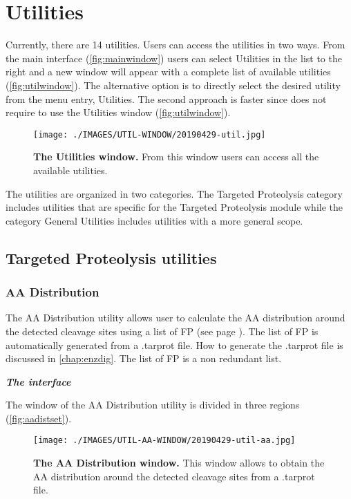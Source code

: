 \chapter{Utilities}
\label{chap:util}

Currently, there are \num{14} utilities. Users can access the utilities in two ways. From the main interface (\autoref{fig:mainwindow}) users can select Utilities in the list to the right and a new window will appear with a complete list of available utilities (\autoref{fig:utilwindow}). The alternative option is to directly select the desired utility from the menu entry, Utilities. The second approach is faster since does not require to use the Utilities window (\autoref{fig:utilwindow}).

\begin{figure}[h]
	\centering
	\texttt{[image: ./IMAGES/UTIL-WINDOW/20190429-util.jpg]}	    
	\caption[The Utilities window]{\textbf{The Utilities window.} From this window users can access all the available utilities.} 
	\label{fig:utilwindow}
	\vspace{-5pt} 	
\end{figure} 

The utilities are organized in two categories. The Targeted Proteolysis category includes utilities that are specific for the Targeted Proteolysis module while the category General Utilities includes utilities with a more general scope.

\section{Targeted Proteolysis utilities }  

\subsection{AA Distribution}
\label{subsec:aadistcalc}
The AA Distribution utility allows user to calculate the AA distribution around the detected cleavage sites using a list of FP (see page \pageref{par:PIP}). The list of FP is automatically generated from a .tarprot file. How to generate the .tarprot file is discussed in \autoref{chap:enzdig}. The list of FP is a non redundant list. 

\textit{\textbf{The interface}}

The window of the AA Distribution utility is divided in three regions (\autoref{fig:aadistset}).

\begin{figure}[h]
	\centering
	\texttt{[image: ./IMAGES/UTIL-AA-WINDOW/20190429-util-aa.jpg]}	    
	\caption[The AA Distribution window]{\textbf{The AA Distribution window.} This window allows to obtain the AA distribution around the detected cleavage sites from a .tarprot file.} 
	\label{fig:aadistset}
	\vspace{-5pt} 	
\end{figure}

